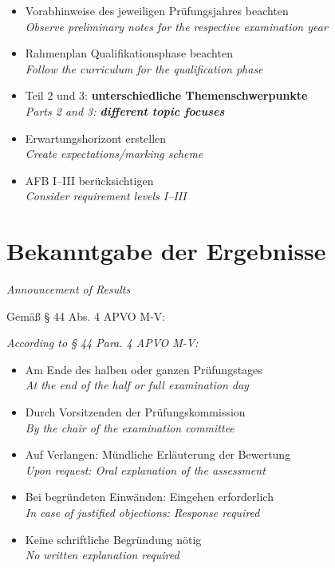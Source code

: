 \documentclass[11pt,a4paper]{article}
\newcommand{\bipar}[2]{%
    #1\par\vspace{2pt}%
    {\small\color{englishgray}\textit{#2}}\par\vspace{8pt}%
}
\newcommand{\bisection}[2]{%
    \section{#1}%
    {\small\color{englishgray}\textit{#2}}\par\vspace{6pt}%
}
\begin{document}
\begin{itemize}
\item Vorabhinweise des jeweiligen Prüfungsjahres beachten\\ {\color{englishgray}\textit{Observe preliminary notes for the respective examination year}}
\item Rahmenplan Qualifikationsphase beachten\\ {\color{englishgray}\textit{Follow the curriculum for the qualification phase}}
\item Teil 2 und 3: \textbf{unterschiedliche Themenschwerpunkte}\\ {\color{englishgray}\textit{Parts 2 and 3: \textbf{different topic focuses}}}
\item Erwartungshorizont erstellen\\ {\color{englishgray}\textit{Create expectations/marking scheme}}
\item AFB I--III berücksichtigen\\ {\color{englishgray}\textit{Consider requirement levels I--III}}
\end{itemize}

\bisection{Bekanntgabe der Ergebnisse}{Announcement of Results}

\bipar{Gemäß § 44 Abs. 4 APVO M-V:}{According to § 44 Para. 4 APVO M-V:}

\begin{itemize}
\item Am Ende des halben oder ganzen Prüfungstages\\ {\color{englishgray}\textit{At the end of the half or full examination day}}
\item Durch Vorsitzenden der Prüfungskommission\\ {\color{englishgray}\textit{By the chair of the examination committee}}
\item Auf Verlangen: Mündliche Erläuterung der Bewertung\\ {\color{englishgray}\textit{Upon request: Oral explanation of the assessment}}
\item Bei begründeten Einwänden: Eingehen erforderlich\\ {\color{englishgray}\textit{In case of justified objections: Response required}}
\item Keine schriftliche Begründung nötig\\ {\color{englishgray}\textit{No written explanation required}}
\end{itemize}

\newpage
\end{document}
